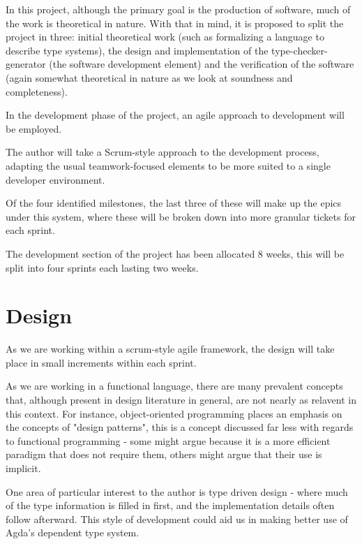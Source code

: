 \documentclass{ProgressReport}[2020/09/15]
\begin{document}
        In this project, although the primary goal is the production
        of software, much of the work is theoretical in nature. With
        that in mind, it is proposed to split the project in three:
        initial theoretical work (such as formalizing a language to
        describe type systems), the design and implementation of the
        type-checker-generator (the software development element) and
        the verification of the software (again somewhat theoretical
        in nature as we look at soundness and completeness).
        
        In the development phase of the project, an agile approach to
        development will be employed. 

        The author will take a Scrum-style approach to the development
        process, adapting the usual teamwork-focused elements to be
        more suited to a single developer environment.

        Of the four identified milestones, the last three of these
        will make up the epics under this system, where these will be
        broken down into more granular tickets for each sprint.

        The development section of the project has been allocated 8
        weeks, this will be split into four sprints each lasting two
        weeks. 
        
        \section{Design}

        As we are working within a scrum-style agile framework, the
        design will take place in small increments within each
        sprint.

        As we are working in a functional language, there are many
        prevalent concepts that, although present in design literature
        in general, are not nearly as relavent in this context. For
        instance, object-oriented programming places an emphasis on
        the concepts of "design patterns", this is a concept discussed
        far less with regards to functional programming - some might
        argue because it is a more efficient paradigm that does not
        require them, others might argue that their use is implicit.

        One area of particular interest to the author is type driven
        design - where much of the type information is filled in
        first, and the implementation details often follow
        afterward. This style of development could aid us in making
        better use of Agda's dependent type system.
\end{document}
